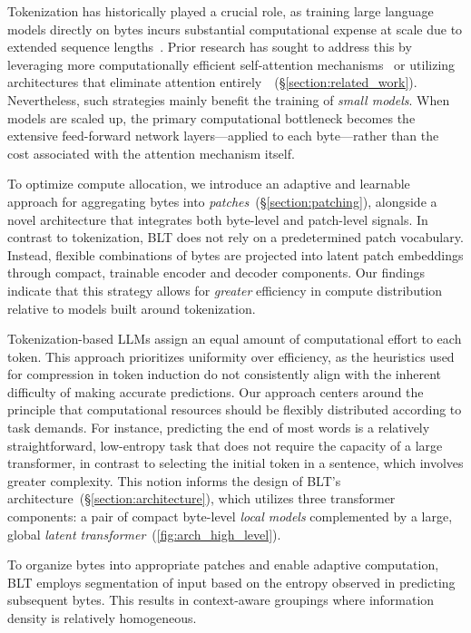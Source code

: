 Tokenization has historically played a crucial role, as training large language models directly on bytes incurs substantial computational expense at scale due to extended sequence lengths~\citep{xue2022byt5}. Prior research has sought to address this by leveraging more computationally efficient self-attention mechanisms~\citep{el2020characterbert, clark2022canine} or utilizing architectures that eliminate attention entirely~\citep{wang2024mambabyte}~(\S\ref{section:related_work}). Nevertheless, such strategies mainly benefit the training of \textit{small models}. When models are scaled up, the primary computational bottleneck becomes the extensive feed-forward network layers—applied to each byte—rather than the cost associated with the attention mechanism itself.

To optimize compute allocation, we introduce an adaptive and learnable approach for aggregating bytes into \textit{patches}~(\S\ref{section:patching}), alongside a novel architecture that integrates both byte-level and patch-level signals. In contrast to tokenization, {\textsc BLT} does not rely on a predetermined patch vocabulary. Instead, flexible combinations of bytes are projected into latent patch embeddings through compact, trainable encoder and decoder components. Our findings indicate that this strategy allows for \textit{greater} efficiency in compute distribution relative to models built around tokenization.

Tokenization-based LLMs assign an equal amount of computational effort to each token. This approach prioritizes uniformity over efficiency, as the heuristics used for compression in token induction do not consistently align with the inherent difficulty of making accurate predictions. Our approach centers around the principle that computational resources should be flexibly distributed according to task demands. For instance, predicting the end of most words is a relatively straightforward, low-entropy task that does not require the capacity of a large transformer, in contrast to selecting the initial token in a sentence, which involves greater complexity. This notion informs the design of {\textsc BLT}'s architecture~(\S\ref{section:architecture}), which utilizes three transformer components: a pair of compact byte-level \textit{local models} complemented by a large, global \textit{latent transformer}~(\autoref{fig:arch_high_level}). 

To organize bytes into appropriate patches and enable adaptive computation, {\textsc BLT} employs segmentation of input based on the entropy observed in predicting subsequent bytes. This results in context-aware groupings where information density is relatively homogeneous.

